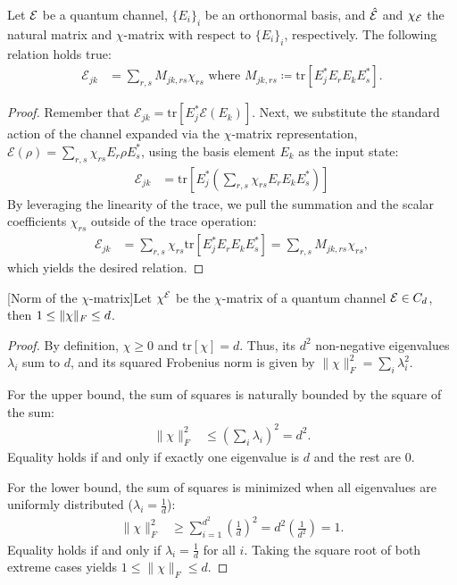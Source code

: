 \begin{prop}
    Let $\mathcal E$ be a quantum channel, $\{E_i\}_i$ be an orthonormal basis, and $\hat{\mathcal E}$ and $\chi_{\mathcal E}$ the natural matrix and $\chi$-matrix with respect to $\{E_i\}_i$, respectively. The following relation holds true:
\begin{align*}
\mathcal{E}_{jk} &= \sum_{r,s} M_{jk,rs} \chi_{rs} \text{ where }M_{jk,rs} \coloneqq \text{tr}[E_j^* E_r E_k E_s^*].
\end{align*}
\end{prop}
\begin{proof}
Remember that $\mathcal{E}_{jk} = \text{tr}[E_j^* \mathcal{E}(E_k)]$. 
Next, we substitute the standard action of the channel expanded via the $\chi$-matrix representation, $\mathcal{E}(\rho) = \sum_{r,s} \chi_{rs} E_r \rho E_s^*$, using the basis element $E_k$ as the input state:
\begin{align*}
\mathcal{E}_{jk} &= \text{tr}\left[ E_j^* \left( \sum_{r,s} \chi_{rs} E_r E_k E_s^* \right) \right]
\end{align*}
By leveraging the linearity of the trace, we pull the summation and the scalar coefficients $\chi_{rs}$ outside of the trace operation:
\begin{align*}
\mathcal{E}_{jk} &= \sum_{r,s} \chi_{rs} \text{tr}[E_j^* E_r E_k E_s^*] = \sum_{r,s} M_{jk,rs} \chi_{rs},
\end{align*}
which yields the desired relation.
\end{proof}
\begin{prop}\label{prop:norm-chi}[Norm of the $\chi$-matrix]Let $\chi^{\mathcal E}$ be the $\chi$-matrix of a quantum channel $\mathcal E \in C_d$, then $1\leq \lVert\chi\rVert_F \leq d$.
\end{prop}
\begin{proof}
By definition, $\chi \ge 0$ and $\text{tr}[\chi] = d$. Thus, its $d^2$ non-negative eigenvalues $\lambda_i$ sum to $d$, and its squared Frobenius norm is given by $\|\chi\|_F^2 = \sum_i \lambda_i^2$.

For the upper bound, the sum of squares is naturally bounded by the square of the sum:
\begin{align*}
    \|\chi\|_F^2 &\le \left( \sum_i \lambda_i \right)^2 = d^2.
\end{align*}
Equality holds if and only if exactly one eigenvalue is $d$ and the rest are $0$.

For the lower bound, the sum of squares is minimized when all eigenvalues are uniformly distributed ($\lambda_i = \frac{1}{d}$):
\begin{align*}
    \|\chi\|_F^2 &\ge \sum_{i=1}^{d^2} \left(\frac{1}{d}\right)^2 = d^2 \left(\frac{1}{d^2}\right) = 1.
\end{align*}
Equality holds if and only if $\lambda_i = \frac{1}{d}$ for all $i$. Taking the square root of both extreme cases yields $1 \le \|\chi\|_F \le d$.
\end{proof}
